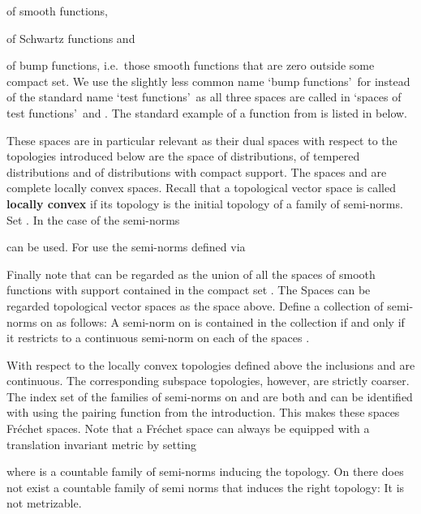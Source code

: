 \documentclass{eptcs-modified}
\newcommand{\demph}{\textbf}
\begin{document}
			of smooth functions,
			
			of Schwartz functions and
			
			of bump functions, i.e.~those smooth functions that are zero outside some compact set.
			We use the slightly less common name \lq bump functions\rq\ for  instead of the standard name \lq test functions\rq\ as all three spaces are called in \lq spaces of test functions\rq\ and .
			The standard example of a function from  is listed in  below.

			These spaces are in particular relevant as their dual spaces with respect to the topologies introduced below are the space  of distributions,  of tempered distributions and  of distributions with compact support.
			The spaces  and  are complete locally convex spaces.
			Recall that a topological vector space is called \demph{locally convex} if its topology is the initial topology of a family  of semi-norms.
			Set  .
			In the case of  the semi-norms
			
			can be used.
			For  use the semi-norms defined via
			
			Finally note that  can be regarded as the union of all the spaces  of smooth functions with support contained in the compact set .
			The Spaces  can be regarded topological vector spaces as the space  above.
			Define a collection of semi-norms on  as follows: A semi-norm  on  is contained in the collection if and only if it restricts to a continuous semi-norm on each of the spaces .

			With respect to the locally convex topologies defined above the inclusions  and  are continuous.
			The corresponding subspace topologies, however, are strictly coarser.
			The index set of the families of semi-norms on  and  are both  and can be identified with  using the pairing function from the introduction.
			This makes these spaces Fr\'echet spaces.
			Note that a Fr\'echet space can always be equipped with a translation invariant metric by setting
			
			where  is a countable family of semi-norms inducing the topology.
			On  there does not exist a countable family of semi norms that induces the right topology:
			It is not metrizable.
\end{document}
